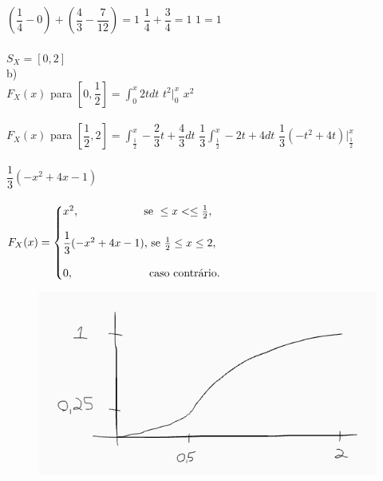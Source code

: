 \documentclass[12pt]{article}
\begin{document}
$\left(\dfrac{1}{4}-0\right)+\left(\dfrac{4}{3}-\dfrac{7}{12}\right)=1$\qquad\qquad
$\dfrac{1}{4}+\dfrac{3}{4}=1$\qquad\qquad
$1=1$\\\\

$S_{X} = [0,2]$\\

\noindent b)\\

$F_{X}(x)$ para $\left[0,\dfrac{1}{2}\right]=\displaystyle\int_{0}^{x}2tdt$\qquad\qquad
$t^{2}\biggr|^{x}_{0}$\qquad\qquad
$x^2$\\\\

$F_{X}(x)$ para $\left[\dfrac{1}{2},2\right]=\displaystyle\int_{\frac{1}{2}}^{x}-\dfrac{2}{3}t+\dfrac{4}{3}dt$\qquad\qquad
$\displaystyle\dfrac{1}{3}\int_{\frac{1}{2}}^{x}-2t+4dt$\qquad\qquad
$\dfrac{1}{3}\left(-t^{2}+4t\right)\biggr|^{x}_{\frac{1}{2}}$\\\\

$\dfrac{1}{3}(-x^{2}+4x-1)$\\\\

$F_{X}(x)=\left\{\begin{array}{@{}l@{}}
	x^2\text{,\qquad\qquad\qquad se }\leq x<\leq\frac{1}{2},\\\\
	\dfrac{1}{3}(-x^{2}+4x-1)\text{, se }\frac{1}{2}\leq x\leq2,\\\\
	0\text{,\qquad\qquad\qquad\quad caso contrário.}
\end{array}\right.$

\begin{figure}[h!]
	\includegraphics[scale=0.7]{q2b}
\end{figure}
	
\end{document}
